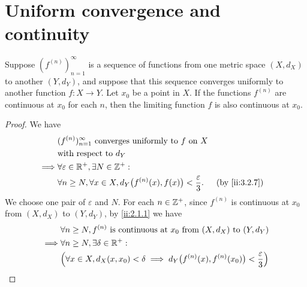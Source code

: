 \section{Uniform convergence and continuity}\label{ii:sec:3.3}

\begin{thm}\label{ii:3.3.1}
  Suppose \((f^{(n)})_{n = 1}^\infty\) is a sequence of functions from one metric space \((X, d_X)\) to another \((Y, d_Y)\), and suppose that this sequence converges uniformly to another function \(f : X \to Y\).
  Let \(x_0\) be a point in \(X\).
  If the functions \(f^{(n)}\) are continuous at \(x_0\) for each \(n\), then the limiting function \(f\) is also continuous at \(x_0\).
\end{thm}

\begin{proof}
  We have
  \begin{align*}
             & (f^{(n)})_{n = 1}^\infty \text{ converges uniformly to } f \text{ on } X                                   \\
             & \text{with respect to } d_Y                                                                                \\
    \implies & \forall \varepsilon \in \R^+, \exists N \in \Z^+ :                                                         \\
             & \forall n \geq N, \forall x \in X, d_Y\big(f^{(n)}(x), f(x)\big) < \dfrac{\varepsilon}{3}. &  & \by{ii:3.2.7}
  \end{align*}
  We choose one pair of \(\varepsilon\) and \(N\).
  For each \(n \in \mathbb{Z}^+\), since \(f^{(n)}\) is continuous at \(x_0\) from \((X, d_X)\) to \((Y, d_Y)\), by \cref{ii:2.1.1} we have
  \begin{align*}
             & \forall n \geq N, f^{(n)} \text{ is continuous at } x_0 \text{ from } (X, d_X) \text{ to } (Y, d_Y)                                                                                            \\
    \implies & \forall n \geq N, \exists \delta \in \R^+ :                                                                                                                                                    \\
             & \Big(\forall x \in X, d_X(x, x_0) < \delta \implies d_Y\big(f^{(n)}(x), f^{(n)}(x_0)\big) < \dfrac{\varepsilon}{3}\Big)                                                                        \\

\end{align*}
\end{proof}
